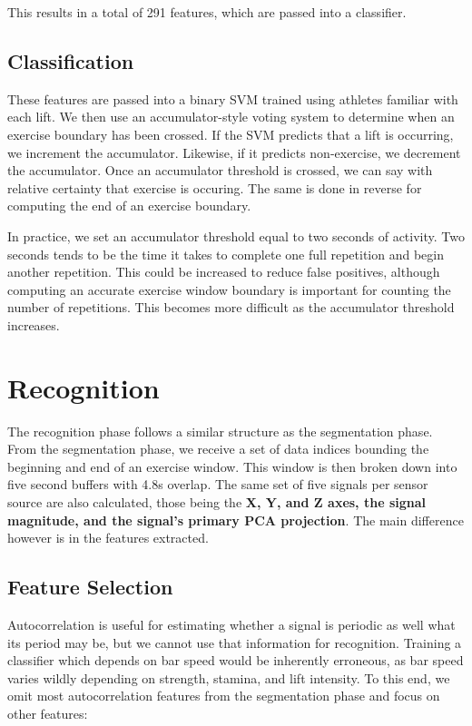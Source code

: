 This results in a total of 291 features, which are passed into a classifier. 

\subsection{Classification}
These features are passed into a binary SVM trained using athletes familiar with each lift. We then use an accumulator-style voting system to determine when an exercise boundary has been crossed. If the SVM predicts that a lift is occurring, we increment the accumulator. Likewise, if it predicts non-exercise, we decrement the accumulator. Once an accumulator threshold is crossed, we can say with relative certainty that exercise is occuring. The same is done in reverse for computing the end of an exercise boundary.

In practice, we set an accumulator threshold equal to two seconds of activity. Two seconds tends to be the time it takes to complete one full repetition and begin another repetition. This could be increased to reduce false positives, although computing an accurate exercise window boundary is important for counting the number of repetitions. This becomes more difficult as the accumulator threshold increases.

\section{Recognition}

The recognition phase follows a similar structure as the segmentation phase. From the segmentation phase, we receive a set of data indices bounding the beginning and end of an exercise window. This window is then broken down into five second buffers with 4.8s overlap. The same set of five signals per sensor source are also calculated, those being the \textbf{X, Y, and Z axes, the signal magnitude, and the signal's primary PCA projection}. The main difference however is in the features extracted.

\subsection{Feature Selection}
Autocorrelation is useful for estimating whether a signal is periodic as well what its period may be, but we cannot use that information for recognition. Training a classifier which depends on bar speed would be inherently erroneous, as bar speed varies wildly depending on strength, stamina, and lift intensity. To this end, we omit most autocorrelation features from the segmentation phase and focus on other features:

